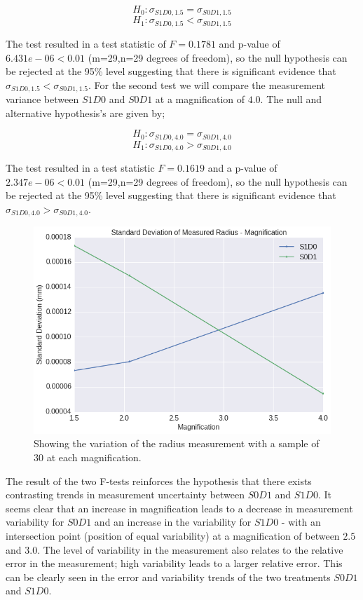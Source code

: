 \documentclass[
  twoside,
  11pt, a4paper,
  footinclude=true,
  headinclude=true,
  cleardoublepage=empty
]{scrbook}
\begin{document}
\[
H_0: \sigma_{S1D0,1.5} = \sigma_{S0D1,1.5}
\]
\[
H_1: \sigma_{S1D0,1.5} < \sigma_{S0D1,1.5}
\]

The test resulted in a test statistic of $F=0.1781$ and p-value of $6.431e-06 < 0.01$ (m=29,n=29 degrees of freedom), so the null hypothesis can be rejected at the 95\% level suggesting that there is significant evidence that $\sigma_{S1D0,1.5} < \sigma_{S0D1,1.5}$. For the second test we will compare the measurement variance between $S1D0$ and  $S0D1$ at a magnification of $4.0$. The null and alternative hypothesis's are given by;

\[
H_0: \sigma_{S1D0,4.0} = \sigma_{S0D1,4.0}
\]
\[
H_1: \sigma_{S1D0,4.0} > \sigma_{S0D1,4.0}
\]

The test resulted in a test statistic $F = 0.1619$ and a p-value of $2.347e-06 < 0.01$ (m=29,n=29 degrees of freedom), so the null hypothesis can be rejected at the 95\% level suggesting that there is significant evidence that $\sigma_{S1D0,4.0} > \sigma_{S0D1,4.0}$.

\begin{figure}[h!]
  \centering
    \includegraphics[width=\textwidth]{figures/output_34_0.png}
    \caption{Showing the variation of the radius measurement with a sample of 30 at each magnification.}
        \label{stdmeasuredradiusxsamples}
\end{figure}

The result of the two F-tests reinforces the hypothesis that there exists contrasting trends in measurement uncertainty between $S0D1$ and $S1D0$. It seems clear that an increase in magnification leads to a decrease in measurement variability for $S0D1$ and an increase in the variability for $S1D0$ - with an intersection point (position of equal variability) at a magnification of between $2.5$ and $3.0$. The level of variability in the measurement also relates to the relative error in the measurement; high variability leads to a larger relative error. This can be clearly seen in the error and variability trends of the two treatments $S0D1$ and $S1D0$.
\end{document}
